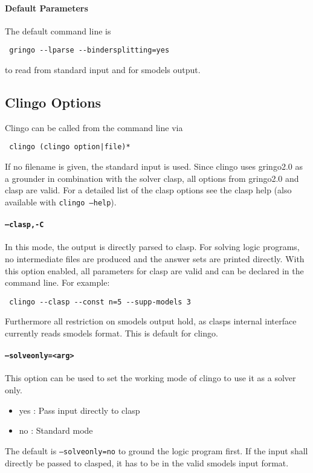 \documentclass[a4paper,10pt]{article}
\begin{document}
\paragraph{Default Parameters}
The default command line is
\begin{verbatim}
 gringo --lparse --bindersplitting=yes
\end{verbatim}
to read from standard input and for smodels output.

\subsection{Clingo Options}

Clingo can be called from the command line via
\begin{verbatim}
 clingo (clingo option|file)*
\end{verbatim}
If no filename is given, the standard input is used.
Since clingo uses gringo2.0 as a grounder in combination with the solver clasp, all options from gringo2.0 and clasp are valid. For a detailed list of the clasp options see the clasp help (also available with \texttt{clingo --help}).
\paragraph{\texttt{--clasp,-C}}
In this mode, the output is directly parsed to clasp. For solving logic programs, no intermediate files are produced and the answer sets are printed directly.
With this option enabled, all parameters for clasp are valid and can be declared in the command line.
For example:
\begin{verbatim}
 clingo --clasp --const n=5 --supp-models 3
\end{verbatim}
Furthermore all restriction on smodels output hold, as clasps internal interface currently reads smodels format.
This is default for clingo.
\paragraph{\texttt{--solveonly=<arg>}}
This option can be used to set the working mode of clingo to use it as a solver only.
\begin{itemize}
\item yes : Pass input directly to clasp
\item no : Standard mode
\end{itemize}
The default is \texttt{--solveonly=no} to ground the logic program first.
If the input shall directly be passed to clasped, it has to be in the valid smodels input format.
\end{document}
